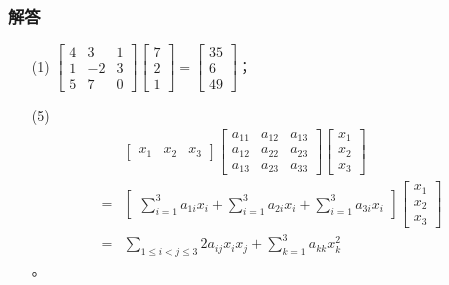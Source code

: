 \documentclass[9pt,xcolor=svgnames]{beamer} %
\begin{document}
\begin{frame}
    \frametitle{解答}
    \begin{enumerate}
        \item[(1)] \(\begin{bmatrix}
                  4 & 3 & 1 \\1&-2&3\\5&7&0
              \end{bmatrix}\begin{bmatrix}
                  7 \\2\\1
              \end{bmatrix}=\begin{bmatrix}
                  35 \\6\\49
              \end{bmatrix}\)；
        \item[(5)]\begin{align*}
                    & \begin{bmatrix}
                          x_1 & x_2 & x_3
                      \end{bmatrix}
                  \begin{bmatrix}
                      a_{11} & a_{12} & a_{13} \\
                      a_{12} & a_{22} & a_{23} \\
                      a_{13} & a_{23} & a_{33}
                  \end{bmatrix}
                  \begin{bmatrix}
                      x_1 \\x_2\\x_3
                  \end{bmatrix}                                                                                    \\
                  = & \begin{bmatrix}\sum_{i=1}^3a_{1i}x_i+\sum_{i=1}^3a_{2i}x_i+\sum_{i=1}^3a_{3i}x_i\end{bmatrix}
                  \begin{bmatrix}x_1 \\x_2 \\x_3\end{bmatrix}                                                       \\
                  = & \sum_{1 \leq i<j \leq 3} 2 a_{i j} x_i x_j+\sum_{k=1}^3 a_{k k} x_k^2
              \end{align*}。
    \end{enumerate}
\end{frame}
\end{document}
